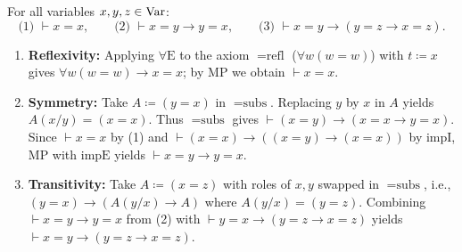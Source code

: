\documentclass[10pt,a4paper]{article}
\begin{document}
\begin{theorem}
For all variables $x, y, z \in {\textrm{Var}}$:
$$\text{(1) } \vdash x = x, \qquad \text{(2) } \vdash x = y \to y = x, \qquad \text{(3) } \vdash x = y \to (y = z \to x = z).$$
\end{theorem}
\myprf
\begin{enumerate}
\item \textbf{Reflexivity:} Applying $\forall\textrm{E}$ to the axiom $=\textrm{refl}$ ($\forall w(w=w)$) with $t \coloneqq x$ gives $\forall w(w=w) \to x=x$; by $\textrm{MP}$ we obtain $\vdash x = x$.
\item \textbf{Symmetry:} Take $A \coloneqq (y = x)$ in $=\textrm{subs}$. Replacing $y$ by $x$ in $A$ yields $A(x/y) = (x = x)$. Thus $=\textrm{subs}$ gives $\vdash (x = y) \to (x = x \to y = x)$. Since $\vdash x = x$ by (1) and $\vdash (x = x) \to ((x = y) \to (x = x))$ by $\textrm{impI}$, $\textrm{MP}$ with $\textrm{impE}$ yields $\vdash x = y \to y = x$.
\item \textbf{Transitivity:} Take $A \coloneqq (x = z)$ with roles of $x, y$ swapped in $=\textrm{subs}$, i.e., $(y = x) \to (A(y/x) \to A)$ where $A(y/x) = (y = z)$. Combining $\vdash x = y \to y = x$ from (2) with $\vdash y = x \to (y = z \to x = z)$ yields $\vdash x = y \to (y = z \to x = z)$.
\end{enumerate}
\myqed
\end{document}
